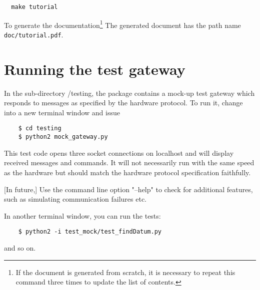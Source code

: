 \documentclass{scrartcl}[12pt,a4paper]
\begin{document}
\begin{verbatim}
  make tutorial
\end{verbatim}

To generate the documentation\footnote{If the document is generated
  from scratch, it is necessary to repeat this command three times to
  update the list of contents.} The generated document has the path
name \texttt{doc/tutorial.pdf}.


\section{Running the test gateway} 

In the sub-directory /testing, the package contains a mock-up test
gateway which responds to messages as specified by the hardware
protocol. To run it, change into a new terminal window and
issue

  \begin{verbatim}
    $ cd testing
    $ python2 mock_gateway.py
  \end{verbatim}    


This test code opens three socket connections on localhost and will
display received messages and commands. It will not necessarily run
with the same speed as the hardware but should match the hardware
protocol specification faithfully.

[In future,] Use the command line option "--help" to check for additional features,
such as simulating communication failures etc.

In another terminal window, you can run the tests:
  \begin{verbatim}
    $ python2 -i test_mock/test_findDatum.py
  \end{verbatim}    
and so on.
\end{document}
